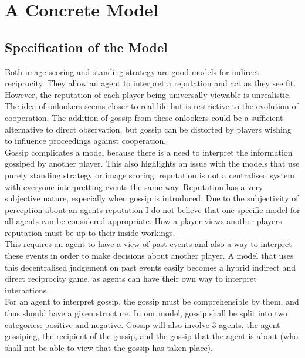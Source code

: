 \documentclass[twoside,twocolumn]{article}
\begin{document}

\section{A Concrete Model}
\subsection{Specification of the Model}
Both image scoring and standing strategy are good models for indirect reciprocity. They allow an agent to interpret a reputation and act as they see fit. However, the reputation of each player being universally viewable is unrealistic. The idea of onlookers seems closer to real life but is restrictive to the evolution of cooperation. The addition of gossip from these onlookers could be a sufficient alternative to direct observation, but gossip can be distorted by players wishing to influence proceedings against cooperation.\\
Gossip complicates a model because there is a need to interpret the information gossiped by another player. This also highlights an issue with the models that use purely standing strategy or image scoring: reputation is not a centralised system with everyone interpretting events the same way. Reputation has a very subjective nature, especially when gossip is introduced. Due to the subjectivity of perception about an agents reputation I do not believe that one specific model for all agents can be considered appropriate. How a player views another players reputation must be up to their inside workings.\\
This requires an agent to have a view of past events and also a way to interpret these events in order to make decisions about another player. A model that uses this decentralised judgement on past events easily becomes a hybrid indirect and direct reciprocity game, as agents can have their own way to interpret interactions.\\
For an agent to interpret gossip, the gossip must be comprehensible by them, and thus should have a given structure. In our model, gossip shall be split into two categories: positive and negative. Gossip will also involve 3 agents, the agent gossiping, the recipient of the gossip, and the gossip that the agent is about (who shall not be able to view that the gossip has taken place).\\
\end{document}
